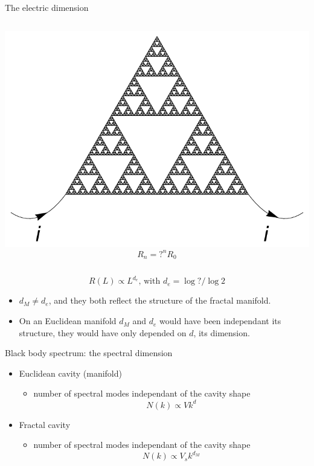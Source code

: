 \documentclass[xcolor=x11names,compress,professionalfonts]{beamer}
\renewcommand{\(}{\begin{columns}}
\renewcommand{\)}{\end{columns}}
\newcommand{\<}[1]{\begin{column}{#1}}
\renewcommand{\>}{\end{column}}
\begin{document}
\begin{frame}{The electric dimension}
\begin{columns}
    \begin{column}{3cm}
    \centering
    \includegraphics[scale=\s]{resInfty.pdf}
    \scriptsize
    \[ R_n= ?^nR_0 \]
  \end{column}
\end{columns}

\[ R(L) \propto L^{d_e} \text{, with } d_e = \log ?/\log 2 \]

\begin{itemize}
	\item $d_M \neq d_e$, and they both reflect the structure of the fractal manifold.
	\item On an Euclidean manifold $d_M$ and $d_e$ would have been independant its structure, they would have only depended on $d$, its dimension.
\end{itemize}

\end{frame}

\begin{frame}{Black body spectrum: the spectral dimension}

\begin{itemize}
	\item Euclidean cavity (manifold)
	\begin{itemize}
		\item number of spectral modes independant of the cavity shape
		\[ N(k) \propto V k^d\]
	\end{itemize}
	
	\item Fractal cavity
	\begin{itemize}
		\item number of spectral modes independant of the cavity shape
		\[ N(k) \propto V_s k^{d_M} \]
	\end{itemize}
\end{itemize}
    
\end{frame}
\end{document}
